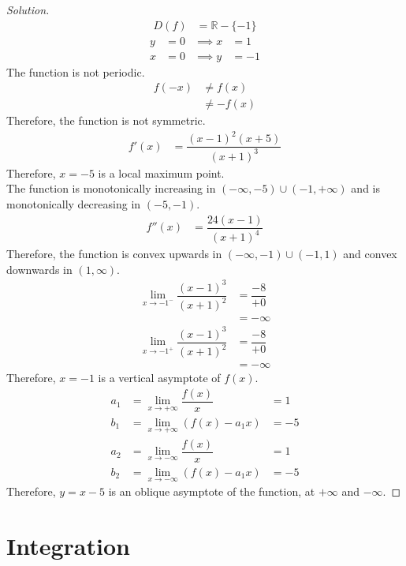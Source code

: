 \documentclass[fleqn, a4paper, 10pt]{article}
\theoremstyle{definition}
\theoremstyle{theorem}
\theoremstyle{remark}
\newenvironment{solution}
	{\begin{proof}[Solution]\let\qed\relax}
	{\end{proof}}
\begin{document}
\begin{multicols}{2}
\begin{solution}
	\begin{align*}
		D(f) &= \mathbb{R} - \{-1\}
	\end{align*}
	\begin{align*}
		y &= 0 &\implies x &= 1\\
		x &= 0 &\implies y &= -1
	\end{align*}
	The function is not periodic.
	\begin{align*}
		f(-x) &\neq f(x) \\
		&\neq -f(x) 
	\end{align*}
	Therefore, the function is not symmetric.
	\begin{align*}
		f'(x) &= \dfrac{(x-1)^2 (x+5)}{(x+1)^3}
	\end{align*}
	Therefore, $x = -5$ is a local maximum point.\\
	The function is monotonically increasing in $(-\infty, -5) \cup (-1, +\infty)$ and is monotonically decreasing in $(-5, -1)$.
	\begin{align*}
		f''(x) &= \dfrac{24(x-1)}{(x+1)^4}
	\end{align*}
	Therefore, the function is convex upwards in $(-\infty, -1) \cup (-1, 1)$ and convex downwards in $(1, \infty)$.
	\begin{align*}
		\lim\limits_{x \to -1^-} \dfrac{(x-1)^3}{(x+1)^2} &= \dfrac{-8}{+0}\\
		&= -\infty\\
		\lim\limits_{x \to -1^+} \dfrac{(x-1)^3}{(x+1)^2} &= \dfrac{-8}{+0}\\
		&= -\infty
	\end{align*}
	Therefore, $x = -1$ is a vertical asymptote of $f(x)$.
	\begin{align*}
		a_1 &= \lim\limits_{x \to +\infty} \dfrac{f(x)}{x} &= 1\\
		b_1 &= \lim\limits_{x \to +\infty} \left(f(x) - a_1 x\right) &= -5\\
		a_2 &= \lim\limits_{x \to -\infty} \dfrac{f(x)}{x} &= 1\\
		b_2 &= \lim\limits_{x \to -\infty} \left(f(x) - a_1 x\right) &= -5
	\end{align*}
	Therefore, $y = x - 5$ is an oblique asymptote of the function, at $+\infty$ and $-\infty$.
\end{solution}

\section{Integration}


\end{multicols}
\end{document}
